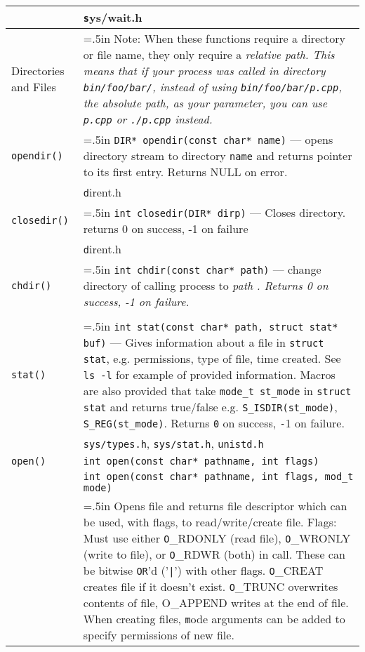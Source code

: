 \documentclass{article}
\newcommand{\indenth}[1][.5]{\hangindent=#1in
                         \hangafter=1 }
\begin{document}
\begin{longtabu}{p{1in}|p{5.7in}}
        \\
    & \texttt sys/wait.h
        \\ \hline
    Directories and Files & \indenth Note: When these functions require a directory or file name, they only require a \itshape relative path\rm. This means that if your process was called in directory \texttt{bin/foo/bar/}, instead of using \texttt{bin/foo/bar/p.cpp}, the \itshape absolute path\rm, as your parameter, you can use \texttt{p.cpp} or \texttt{./p.cpp} instead. \par
        \\
    \texttt{opendir()} & \indenth\texttt{DIR* opendir(const char* name)} --- opens directory stream to directory \texttt{name} and returns pointer to its first entry. Returns NULL on error. 
        \\
    & \texttt dirent.h
        \\ \hline
    \texttt{closedir()} & \indenth\texttt{int closedir(DIR* dirp)} --- Closes  directory. returns 0 on success, -1 on failure
        \\
    & \texttt dirent.h
        \\ \hline
    \texttt{chdir()} & \indenth\texttt{int chdir(const char* path)} --- change directory of calling process to \it path \rm . Returns 0 on success, -1 on failure.
        \\
    & \texttt
        \\ \hline
    \texttt{stat()} & \indenth\texttt{int stat(const char* path,  struct stat* buf)} --- Gives information about a file in \texttt{struct stat}, e.g. permissions, type of file, time created. See \texttt{ls -l} for example of provided information. Macros are also provided that take \texttt{mode_t st_mode} in \texttt{struct stat} and returns true/false e.g. \texttt{S_ISDIR(st_mode)}, \texttt{S_REG(st_mode)}. Returns \texttt 0 on success, \texttt -1 on failure.
        \\
    & \texttt{sys/types.h}, \texttt{sys/stat.h}, \texttt{unistd.h}
        \\ \hline
    \texttt{open()} & \texttt{int open(const char* pathname, int flags)}
        \\
    & \texttt{int open(const char* pathname, int flags, mod\_t mode)}
        \\
    & \indenth Opens file and returns file descriptor which can be used, with flags, to read/write/create file. Flags: Must use either \texttt O\_RDONLY (read file), \texttt O_WRONLY (write to file), or \texttt O_RDWR (both) in call. These can be bitwise \texttt{OR}'d ('\texttt{|}') with other flags. \texttt O_CREAT creates file if it doesn't exist. \texttt O_TRUNC overwrites contents of file, O_APPEND writes at the end of file. When creating files, \texttt mode arguments can be added to specify permissions of new file.

\end{longtabu}
\end{document}
